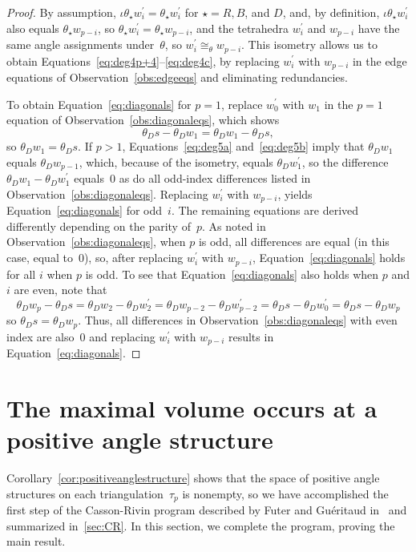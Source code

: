 \documentclass[reqno]{amsart}
\theoremstyle{plain}
\theoremstyle{definition}
\begin{document}
\begin{proof}
By assumption,
$\iota\theta_\star w_i^\prime=\theta_\star w_i^\prime$ for $\star=R, B$, and $D$, and, by definition, $\iota\theta_\star w_i^\prime$ also equals $\theta_\star w_{p-i}$, so $\theta_\star w_i^\prime=\theta_\star w_{p-i}$, and the tetrahedra $w_i^\prime$ and $w_{p-i}$ have the same angle assignments under~$\theta$, so $w_i^\prime\cong_\theta w_{p-i}$.  This isometry allows us to obtain Equations~\eqref{eq:deg4p+4}--\eqref{eq:deg4c}, by replacing $w_i^\prime$ with $w_{p-i}$ in the edge equations of Observation~\ref{obs:edgeeqs} and eliminating redundancies.  

To obtain Equation~\eqref{eq:diagonals} for $p=1$, replace $w_0^\prime$ with $w_1$ in the $p=1$ equation of Observation~\ref{obs:diagonaleqs}, which shows 
$$
\theta_D s-\theta_D w_1
    =\theta_D w_1-\theta_D s,
$$
so $\theta_D w_1=\theta_D s$.  
If $p>1$, Equations~\eqref{eq:deg5a} and~\eqref{eq:deg5b} imply that $\theta_D w_1$ equals $\theta_D w_{p-1}$, which, because of the isometry, equals $\theta_D w_1^\prime$, so the difference $\theta_D w_1-\theta_D w_1^\prime$ equals~0 as do all odd-index differences listed in Observation~\ref{obs:diagonaleqs}. Replacing $w_i^\prime$ with $w_{p-i}$, yields Equation~\eqref{eq:diagonals} for odd~$i$.  The remaining equations are derived differently depending on the parity of~$p$.  As noted in Observation~\ref{obs:diagonaleqs}, when $p$ is odd, all differences are equal (in this case, equal to~0), so, after replacing $w_i^\prime$ with $w_{p-i}$, Equation~\eqref{eq:diagonals} holds for all $i$ when $p$ is odd. To see that Equation~\eqref{eq:diagonals} also holds when $p$ and $i$ are even, note that
$$
\theta_D w_p-\theta_D s
   =\theta_D w_2-\theta_D w_2^\prime
    =\theta_D w_{p-2}-\theta_D w_{p-2}^\prime
    =\theta_D s-\theta_D w_0^\prime
    =\theta_D s-\theta_D w_p
$$
so $\theta_D s=\theta_D w_p$. Thus, all differences in Observation~\ref{obs:diagonaleqs} with even index are also~0 and  replacing  $w_i^\prime$ with $w_{p-i}$ results in Equation~\eqref{eq:diagonals}.
\end{proof}

\section{The maximal volume occurs at a positive angle structure}\label{sec:proofq=1}

Corollary~\ref{cor:positiveanglestructure} shows that the space of positive angle structures on each triangulation~$\tau_{p}$ is nonempty, so we have accomplished the first step of the Casson-Rivin program described by  Futer and Gu\'eritaud in~\cite{AngledtoHyperbolic} and summarized in~\ref{sec:CR}.  In this section, we complete the program, proving the main result.
\end{document}
